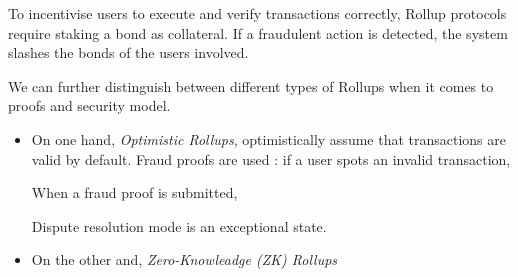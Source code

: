 To incentivise users to execute and verify transactions correctly, Rollup protocols require staking a bond as collateral. If a fraudulent action is detected, the system slashes the bonds of the users involved. 

We can further distinguish between different types of Rollups when it comes to proofs and security model. 
\begin{itemize}
    \item On one hand, \textit{Optimistic Rollups}, optimistically assume that transactions are valid by default.  Fraud proofs are used : if a user spots an invalid transaction, 
    
    When a fraud proof is submitted, 
    
    Dispute  resolution mode is an exceptional state. 
    \item On the other and, \textit{Zero-Knowleadge (ZK) Rollups}
\end{itemize}




